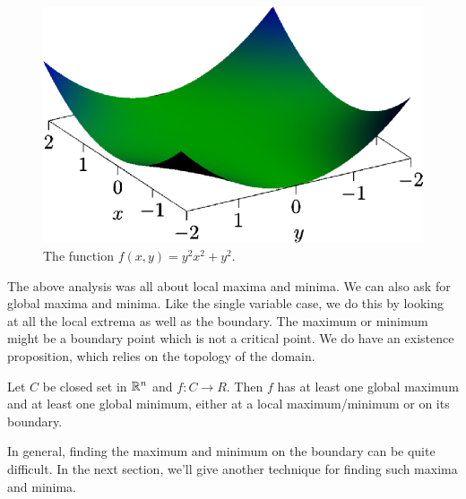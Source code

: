 \documentclass[fleqn,letterpaper]{report}
\begin{document}
\begin{figure}[t]
\centering
\includegraphics[width=12cm]{figure45.eps}
\caption{The function $f(x,y) = y^2x^2 + y^2$.}
\label{figure-3d-graph7}
\end{figure}

The above analysis was all about local maxima and minima. We
can also ask for global maxima and minima. Like the single
variable case, we do this by looking at all the local extrema
as well as the boundary. The maximum or minimum might be a
boundary point which is not a critical point. We do have an
existence proposition, which relies on the topology of the
domain. 

\begin{prop}
Let $C$ be closed set in $\mathbb{R}^n$ and $f: C \rightarrow R$.
Then $f$ has at least one global maximum and at least one
global minimum, either at a local maximum/minimum or on its
boundary.
\end{prop}

In general, finding the maximum and minimum on the boundary
can be quite difficult. In the next section, we'll 
give another technique for finding such maxima and minima.
\end{document}
